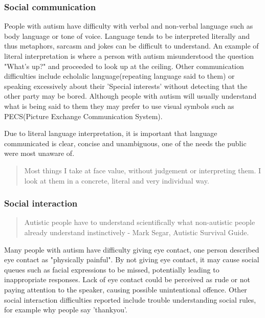 \documentclass[11pt]{report}
\begin{document}
\subsubsection*{Social communication}
People with autism have difficulty with verbal and non-verbal language such as body language or tone of voice. Language tends to be interpreted literally and thus metaphors, sarcasm and jokes can be difficult to understand\cite{nas}. An example of literal interpretation is where a person with autism misunderstood the question "What's up?" and proceeded to look up at the ceiling. Other communication difficulties include echolalic language(repeating language said to them) or speaking excessively about their 'Special interests' without detecting that the other party may be bored\cite{nas}. Although people with autism will usually understand what is being said to them they may prefer to use visual symbols such as PECS(Picture Exchange Communication System). 

Due to literal language interpretation, it is important that language communicated is clear, concise and unambiguous, one of the needs the public were most unaware of\cite{autismmisconception}.

\begin{quote}
Most things I take at face value, without judgement or interpreting them. I look at them in a concrete, literal and very individual way. \cite{olgab}
\end{quote}

\subsubsection*{Social interaction}

\begin{quote}
Autistic people have to understand scientifically what non-autistic people already understand instinctively 
- Mark Segar, Autistic Survival Guide.
\end{quote}

Many people with autism have difficulty giving eye contact, one person described eye contact as "physically painful". By not giving eye contact, it may cause social queues such as facial expressions to be missed, potentially leading to inappropriate responses. Lack of eye contact could be perceived as rude or not paying attention to the speaker, causing possible unintentional offence. Other social interaction difficulties reported include trouble understanding social rules\cite{nas}, for example why people say 'thankyou'.
\end{document}
